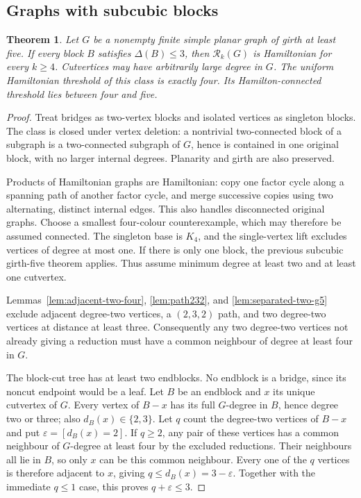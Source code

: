 \documentclass[11pt]{article}
\newtheorem{theorem}{Theorem}[section]
\theoremstyle{remark}
\newcommand{\Rk}{\mathcal R_k}
\numberwithin{equation}{section}
\numberwithin{table}{section}
\begin{document}
\subsection{Graphs with subcubic blocks}
\begin{theorem}\label{thm:block-subcubic}
Let $G$ be a nonempty finite simple planar graph of girth at least
five. If every block $B$ satisfies $\Delta(B)\le3$, then $\Rk(G)$ is
Hamiltonian for every $k\ge4$. Cutvertices may have arbitrarily large
degree in $G$. The uniform Hamiltonian threshold of this class is exactly four.
Its Hamilton-connected threshold lies between four and five.
\end{theorem}
\begin{proof}
Treat bridges as two-vertex blocks and isolated vertices as singleton
blocks. The class is closed under vertex deletion: a nontrivial
two-connected block of a subgraph is a two-connected subgraph of
$G$, hence is contained in one original block, with no larger
internal degrees. Planarity and girth are also preserved.

Products of Hamiltonian graphs are Hamiltonian: copy one factor
cycle along a spanning path of another factor cycle, and merge
successive copies using two alternating, distinct internal edges.
This also handles disconnected original graphs. Choose a smallest
four-colour counterexample, which may therefore be assumed connected.
The singleton base is $K_4$, and the single-vertex lift excludes
vertices of degree at most one. If there is only one block, the
previous subcubic girth-five theorem applies. Thus assume minimum
degree at least two and at least one cutvertex.

Lemmas~\ref{lem:adjacent-two-four}, \ref{lem:path232}, and
\ref{lem:separated-two-g5} exclude adjacent degree-two vertices, a
$(2,3,2)$ path, and two degree-two vertices at distance at least three.
Consequently any two degree-two vertices not already giving a
reduction must have a common neighbour of degree at least four in $G$.

The block-cut tree has at least two endblocks. No endblock is a
bridge, since its noncut endpoint would be a leaf. Let $B$ be an
endblock and $x$ its unique cutvertex of $G$. Every vertex of
$B-x$ has its full $G$-degree in $B$, hence degree two or three;
also $d_B(x)\in\{2,3\}$. Let $q$ count the degree-two vertices of $B-x$ and put
$\varepsilon=[d_B(x)=2]$. If $q\ge2$, any pair of these vertices
has a common neighbour of $G$-degree at least four by the excluded
reductions. Their neighbours all lie in $B$, so only $x$ can be
this common neighbour. Every one of the $q$ vertices is therefore
adjacent to $x$, giving $q\le d_B(x)=3-\varepsilon$. Together with
the immediate $q\le1$ case, this proves $q+\varepsilon\le3$.


\end{proof}
\end{document}
